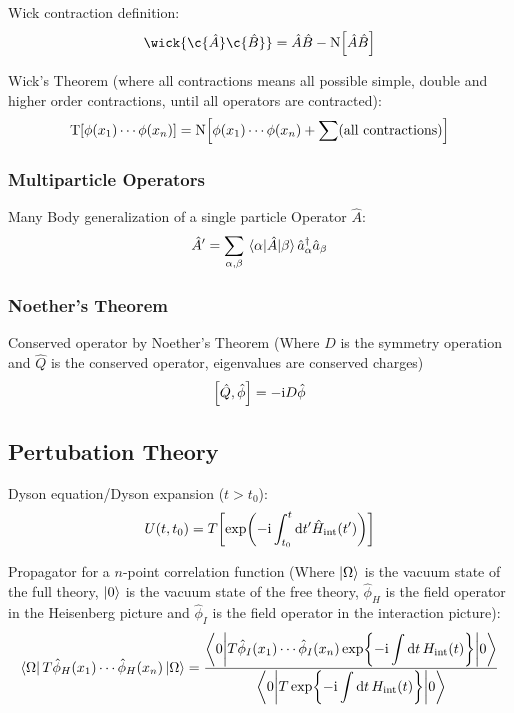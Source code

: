 			\noindent
			Wick contraction definition:
			\begin{equation}
				\wick{\c{\hat{A}} \c{\hat{B}}} = \hat{A}\hat{B} - \NormalOrder{\hat{A}\hat{B}}
			\end{equation}

			\noindent
			Wick's Theorem (where all contractions means all possible simple, double and higher order contractions, until all operators are contracted):
			\begin{equation}
				\mathrm{T}\qty[\phi(x_1)\dotsb\phi(x_n)] = \mathrm{N}\qty[\phi(x_1)\dotsb\phi(x_n) + \sum(\text{all contractions})]
			\end{equation}
			
		\subsubsection{Multiparticle Operators}
			Many Body generalization of a single particle Operator $\hat{A}$:
			\begin{equation}
				\hat{A}' = \sum_{\alpha,\beta} \mel{\alpha}{\hat{A}}{\beta} \hat{a}_\alpha^\dagger \hat{a}_\beta
			\end{equation}

		\subsubsection{Noether's Theorem}
			\noindent
			Conserved operator by Noether's Theorem (Where $D$ is the symmetry operation and $\hat{Q}$ is the conserved operator, \ie eigenvalues are conserved charges)
			\begin{equation}
				\comm{\hat{Q}}{\hat{\phi}} = -\i D\hat{\phi}
			\end{equation}
			
	\subsection{Pertubation Theory}
		Dyson equation/Dyson expansion ($t > t_0$):
		\begin{equation}
			U(t,t_0) = T \qty[ \exp(-\mathrm{i} \int_{t_0}^t \dd t' \hat{H}_{\mathrm{int}}(t')) ]
		\end{equation}

		\noindent
		Propagator for a $n$-point correlation function (Where $\Ket{\Omega}$ is the vacuum state of the full theory, $\Ket{0}$ is the vacuum state of the free theory, $\hat{\phi}_H$ is the field operator in the Heisenberg picture and $\hat{\phi}_I$ is the field operator in the interaction picture):
		\begin{equation}
			\Bra{\Omega} T \hat{\phi}_H(x_1) \dotsb \hat{\phi}_H(x_n) \Ket{\Omega}
			= \frac{ \mel**{0}{T \hat{\phi}_I(x_1) \dotsb \hat{\phi}_I(x_n) \exp{-\mathrm{i}\displaystyle\int \dd t \, H_{\mathrm{int}}(t)}}{0}}
			{\mel**{0}{T\exp{-\mathrm{i}\displaystyle\int \dd t \, H_{\mathrm{int}}(t)}}{0}}
		\end{equation}

